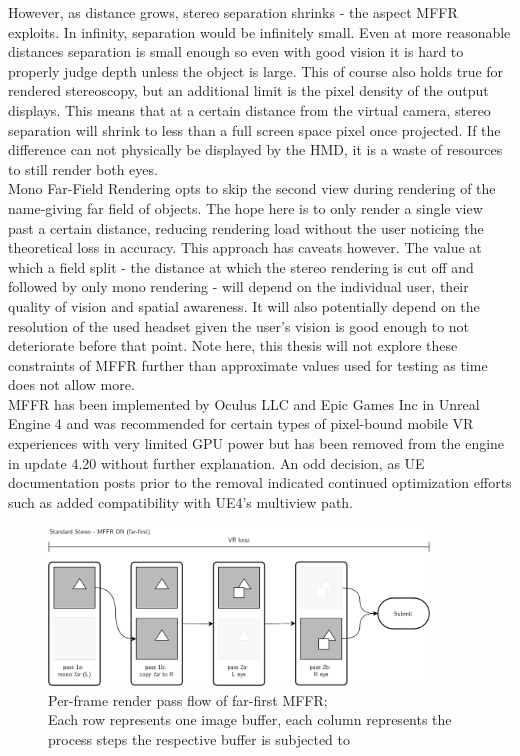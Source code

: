 However, as distance grows, stereo separation shrinks - the aspect \gls{MFFR} exploits. In infinity, separation would be infinitely small. Even at more reasonable distances separation is small enough so even with good vision it is hard to properly judge depth unless the object is large. This of course also holds true for rendered stereoscopy, but an additional limit is the pixel density of the output displays. This means that at a certain distance from the virtual camera, stereo separation will shrink to less than a full screen space pixel once projected. If the difference can not physically be displayed by the \gls{HMD}, it is a waste of resources to still render both eyes. \\
Mono Far-Field Rendering opts to skip the second view during rendering of the name-giving far field of objects. The hope here is to only render a single view past a certain distance, reducing rendering load without the user noticing the theoretical loss in accuracy. 
This approach has caveats however. The value at which a field split - the distance at which the stereo rendering is cut off and followed by only mono rendering - will depend on the individual user, their quality of vision and spatial awareness. It will also potentially depend on the resolution of the used headset given the user's vision is good enough to not deteriorate before that point. Note here, this thesis will not explore these constraints of \gls{MFFR} further than approximate values used for testing as time does not allow more. \\
\gls{MFFR} has been implemented by Oculus LLC and Epic Games Inc in Unreal Engine 4 and was recommended for certain types of pixel-bound mobile \gls{VR} experiences with very limited GPU power but  has been removed from the engine in update 4.20 without further explanation. An odd decision, as UE documentation posts prior to the removal indicated continued optimization efforts such as added compatibility with UE4's multiview path\cite{EpicGamesInc..2016}. 

\begin{figure}[htb]
  \centering
  \includegraphics[width=0.9\textwidth]{pictures/MFFR_farfirst}
  \caption{Per-frame render pass flow of far-first \gls{MFFR}; \\
  Each row represents one image buffer, each column represents the process steps the respective buffer is subjected to} \label{fig:flowchart_MFFR_FarFirst}
\end{figure}

